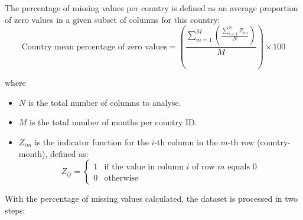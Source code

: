 \documentclass[runningheads]{llncs}
\begin{document}
    The percentage of missing values per country is defined as an average proportion of zero values in a given subset of columns for this country:
    \[
        \text{Country mean percentage of zero values} = \left( \frac{\sum_{m=1}^{M} \left( \frac{\sum_{i=1}^{N} Z_{im}}{N} \right)}{M} \right) \times 100
    \]

    where


    \begin{itemize}
        \item \( N \) is the total number of columns to analyse.
        \item \( M \) is the total number of months per country ID.
        \item \( Z_{im} \) is the indicator function for the \(i\)-th column in the \(m\)-th row (country-month), defined as:
        \[
            Z_{ij} = \begin{cases}
                         1 & \text{if the value in column } i \text{ of row } m \text{ equals 0} \\
                         0 & \text{otherwise}
            \end{cases}
        \]
    \end{itemize}


    With the percentage of missing values calculated, the dataset is processed in two steps:
\end{document}
